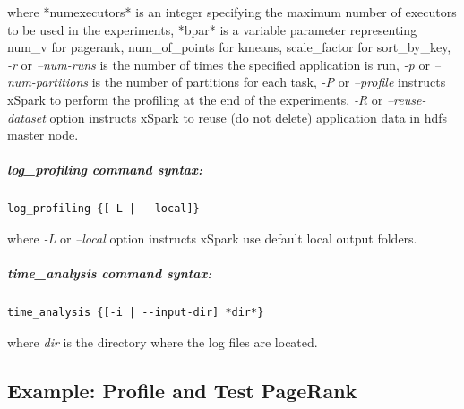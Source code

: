 where *numexecutors* is an integer specifying the maximum number of executors to be used in the experiments, *bpar* is a variable parameter representing num\_v for pagerank, num\_of\_points for kmeans, scale\_factor for sort\_by\_key, \emph{-r} or \emph{--num-runs} is the number of times the specified application is run, \emph{-p} or \emph{--num-partitions} is the number of partitions for each task,
\emph{-P} or \emph{--profile} instructs xSpark to perform the profiling at the end of the experiments, \emph{-R} or \emph{--reuse-dataset} option instructs xSpark to reuse (do not delete) application data in hdfs master node.

\hypertarget{log_profiling-command-syntax}{%
\subparagraph{\texorpdfstring{\emph{log\_profiling} command
		syntax:}{log\_profiling command syntax:}}\label{log_profiling-command-syntax}}

\begin{verbatim}
log_profiling {[-L | --local]}
\end{verbatim}

where \emph{-L} or \emph{--local} option instructs xSpark use default
local output folders.

\hypertarget{time_analysis-command-syntax}{%
\subparagraph{\texorpdfstring{\emph{time\_analysis} command
		syntax:}{time\_analysis command syntax:}}\label{time_analysis-command-syntax}}

\begin{verbatim}
time_analysis {[-i | --input-dir] *dir*}
\end{verbatim}

where \emph{dir} is the directory where the log files are located.

\hypertarget{example-profile-and-test-pagerank}{%
\subsection{Example: Profile and Test
	PageRank}\label{example-profile-and-test-pagerank}}

